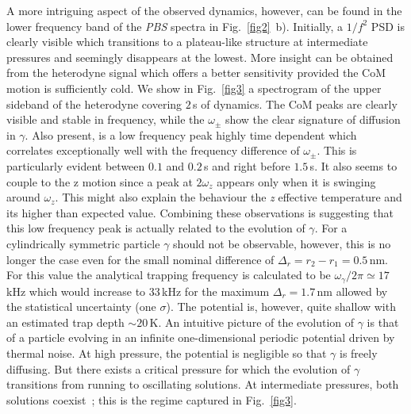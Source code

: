 \documentclass[aps,pra,twocolumn,nopacs,superscriptaddress,groupedaddress]{revtex4}
\begin{document}
A more intriguing aspect of the observed dynamics, however, can be found in the lower frequency band of the \textit{PBS} spectra in Fig.~\ref{fig2}~b). Initially, a $1/f^2$ PSD is clearly visible which transitions to a plateau-like structure at intermediate pressures and seemingly disappears at the lowest. More insight can be obtained from the heterodyne signal which offers a better sensitivity provided the CoM motion is sufficiently cold. We show in Fig.~\ref{fig3} a spectrogram of the upper sideband of the heterodyne covering $2$\,s of dynamics. The CoM peaks are clearly visible and stable in frequency, while the $\omega_{\pm}$ show the clear signature of diffusion in $\gamma$. Also present, is a low frequency peak highly time dependent which correlates exceptionally well with the frequency difference of $\omega_{\pm}$. This is particularly evident between $0.1$ and $0.2$\,s and right before $1.5$\,s. It also seems to couple to the z motion since a peak at $2\omega_z$ appears only when it is swinging around $\omega_z$. This might also explain the behaviour the \textit{z} effective temperature and its higher than expected value. Combining these observations is suggesting that this low frequency peak is actually related to the evolution of $\gamma$. For a cylindrically symmetric particle $\gamma$ should not be observable, however, this is no longer the case even for the small nominal difference of $\Delta_r=r_2-r_1=0.5$\,nm. For this value the analytical trapping frequency is calculated to be $\omega_{\gamma}/2\pi\simeq17$\,kHz which would increase to $33$\,kHz for the maximum $\Delta_r=1.7$\,nm allowed by the statistical uncertainty (one $\sigma$). The potential is, however, quite shallow with an estimated trap depth $\sim20$\,K. An intuitive picture of the evolution of $\gamma$ is that of a particle evolving in an infinite one-dimensional periodic potential driven by thermal noise. At high pressure, the potential is negligible so that $\gamma$ is freely diffusing. But there exists a critical pressure for which the evolution of $\gamma$ transitions from running to oscillating solutions. At intermediate pressures, both solutions coexist~\cite{Risken1989,tsallis_1,tsallis_2}; this is the regime captured in Fig.~\ref{fig3}.
\end{document}
